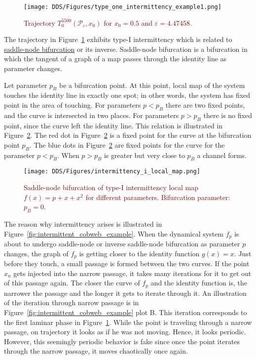 \begin{figure}[!h]
    \centering
    \texttt{[image: DDS/Figures/type\_one\_intermittency\_example1.png]}
    \caption{
        \textcolor{darkred}{
        Trajectory $T^{5500}_{0}(\mathcal{P}_{\varepsilon}, x_0)$ for $x_0 = 0.5$ and $\varepsilon = 4.47458$.
        }
    }
    \label{fig:intermittent_trajectory_example}
\end{figure}

The trajectory in Figure~\ref{fig:intermittent_trajectory_example} exhibits type-I intermittency which is related to \hyperref[def:saddle_node_bif]{saddle-node bifurcation} or its inverse.
Saddle-node bifurcation is a bifurcation in which the tangent of a graph of a map passes through the identity line as parameter changes.
\par
Let parameter $p_{B}$ be a bifurcation point.
At this point, local map of the system touches the identity line in exactly one spot; in other words, the system has fixed point in the area of touching.
For parameters $p < p_{B}$ there are two fixed points, and the curve is intersected in two places.
For parameters $p > p_{B}$ there is no fixed point, since the curve left the identity line.
This relation is illustrated in Figure~\ref{fig:saddle_node_bifurcation}.
The red dot in Figure~\ref{fig:saddle_node_bifurcation} is a fixed point for the curve at the bifurcation point $p_{B}$.
The blue dots in Figure~\ref{fig:saddle_node_bifurcation} are fixed points for the curve for the parameter $p < p_{B}$.
When $p > p_{B}$ is greater but very close to $p_{B}$ a channel forms.
\begin{figure}[!h]
    \centering
    \texttt{[image: DDS/Figures/intermittency\_i\_local\_map.png]}
    \caption{
        \textcolor{darkred}{
        Saddle-node bifurcation of type-I intermittency local map $f(x) = p + x + x^2$ for different parameters. 
        Bifurcation parameter: $p_B = 0$.
        }
    }
    \label{fig:saddle_node_bifurcation}
\end{figure}


The reason why intermittency arises is illustrated in Figure~\ref{fig:intermittent_cobweb_example}.
When the dynamical system $f_p$ is about to undergo saddle-node or inverse saddle-node bifurcation as parameter $p$ changes, the graph of $f_p$ is getting closer to the identity function $g(x)=x$.
Just before they touch, a small passage is formed between the two curves.
If the point $x_n$ gets injected into the narrow passage, it takes many iterations for it to get out of this passage again.
The closer the curve of $f_p$ and the identity function is, the narrower the passage and the longer it gets to iterate through it.
An illustration of the iteration through narrow passage is in Figure~\ref{fig:intermittent_cobweb_example} plot B.
This iteration corresponds to the first laminar phase in Figure~\ref{fig:intermittent_trajectory_example}.
While the point is traveling through a narrow passage, on trajectory it looks as if he was not moving.
Hence, it looks periodic.
However, this seemingly periodic behavior is fake since once the point iterates through the narrow passage, it moves chaotically once again.

